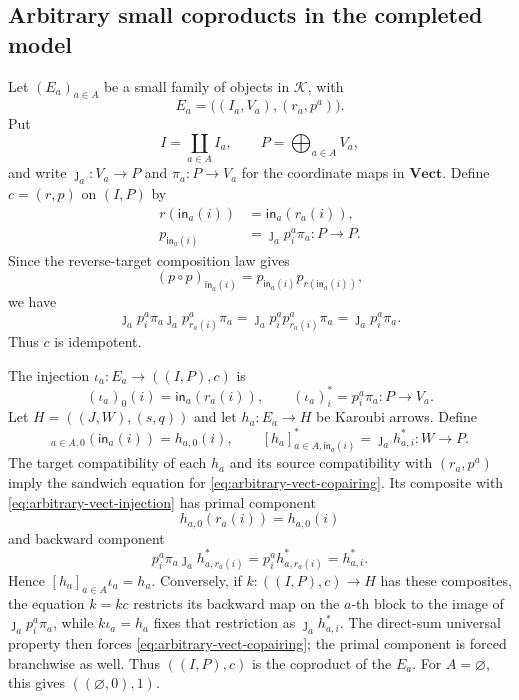\documentclass[runningheads,envcountsame]{llncs}
\newcommand{\Vect}{\mathbf{Vect}}
\begin{document}
\subsection{Arbitrary small coproducts in the completed model}
\label{app:arbitrary-vect-coproducts}

Let $(E_a)_{a\in A}$ be a small family of objects in $\mathcal K$, with
$$
E_a=\bigl((I_a,V_a),(r_a,p^a)\bigr).
$$
Put
$$
I=\coprod_{a\in A}I_a,
\qquad
P=\bigoplus_{a\in A}V_a,
$$
and write $\jmath_a:V_a\to P$ and $\pi_a:P\to V_a$ for the coordinate maps in $\Vect$. Define $c=(r,p)$ on $(I,P)$ by
\begin{equation}
\begin{aligned}
r(\mathsf{in}_a(i))
&=\mathsf{in}_a(r_a(i)),\\
p_{\mathsf{in}_a(i)}
&=\jmath_a p^a_i\pi_a:P\longrightarrow P.
\end{aligned}
\label{eq:arbitrary-vect-coproduct}
\end{equation}
Since the reverse-target composition law gives
$$
(p\circ p)_{\mathsf{in}_a(i)}
=
p_{\mathsf{in}_a(i)}p_{r(\mathsf{in}_a(i))},
$$
we have
$$
\jmath_a p^a_i\pi_a\jmath_a p^a_{r_a(i)}\pi_a
=
\jmath_a p^a_i p^a_{r_a(i)}\pi_a
=
\jmath_a p^a_i\pi_a.
$$
Thus $c$ is idempotent.

The injection $\iota_a:E_a\to((I,P),c)$ is
\begin{equation}
(\iota_a)_0(i)=\mathsf{in}_a(r_a(i)),
\qquad
(\iota_a)^*_i=p^a_i\pi_a:P\longrightarrow V_a.
\label{eq:arbitrary-vect-injection}
\end{equation}
Let $H=((J,W),(s,q))$ and let $h_a:E_a\to H$ be Karoubi arrows. Define
\begin{equation}
[h_a]_{a\in A,0}(\mathsf{in}_a(i))=h_{a,0}(i),
\qquad
[h_a]_{a\in A,\mathsf{in}_a(i)}^*
=\jmath_a h_{a,i}^*:W\longrightarrow P.
\label{eq:arbitrary-vect-copairing}
\end{equation}
The target compatibility of each $h_a$ and its source compatibility with $(r_a,p^a)$ imply the sandwich equation for \eqref{eq:arbitrary-vect-copairing}. Its composite with \eqref{eq:arbitrary-vect-injection} has primal component
$$
h_{a,0}(r_a(i))=h_{a,0}(i)
$$
and backward component
$$
p^a_i\pi_a\jmath_a h^*_{a,r_a(i)}
=
p^a_i h^*_{a,r_a(i)}
=
h^*_{a,i}.
$$
Hence $[h_a]_{a\in A}\iota_a=h_a$. Conversely, if $k:((I,P),c)\to H$ has these composites, the equation $k=kc$ restricts its backward map on the $a$-th block to the image of $\jmath_a p^a_i\pi_a$, while $k\iota_a=h_a$ fixes that restriction as $\jmath_a h^*_{a,i}$. The direct-sum universal property then forces \eqref{eq:arbitrary-vect-copairing}; the primal component is forced branchwise as well. Thus $((I,P),c)$ is the coproduct of the $E_a$. For $A=\varnothing$, this gives $((\varnothing,0),1)$.
\end{document}
